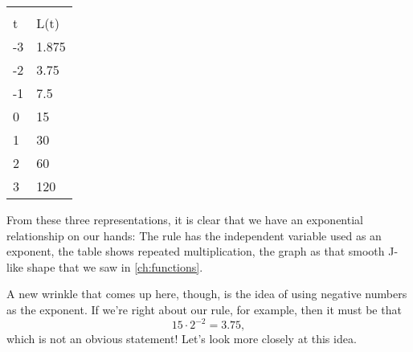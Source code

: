 \begin{minipage}[c]{0.5\textwidth }
	\centering
	\begin{tabular}{|C{2cm}|C{2cm}|}
	\hline
	 & \\
	t & L(t)\\ & 1.875\\
	-2 & 3.75\\
	-1 & 7.5\\
	0 & 15\\
	1 & 30\\
	2 & 60\\
	3 & 120\\\hline
	\end{tabular}
\end{minipage}%
%
\begin{minipage}[c]{0.5\textwidth }
	\centering
\end{minipage}
\medskip

From these three representations, it is clear that we have an exponential relationship on our hands: The rule has the independent variable used as an exponent, the table shows repeated multiplication, the graph as that smooth J-like shape that we saw in \cref{ch:functions}.

A new wrinkle that comes up here, though, is the idea of using negative numbers as the exponent. If we're right about our rule, for example, then it must be that \[15 \cdot 2^{-2} = 3.75,\]
which is not an obvious statement! Let's look more closely at this idea.

